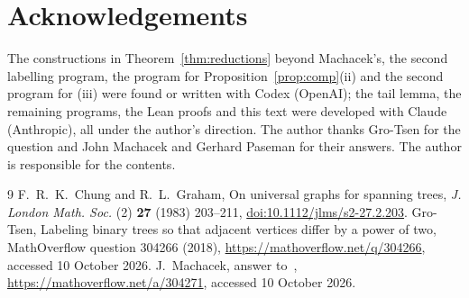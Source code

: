 \documentclass[11pt]{article}
\theoremstyle{remark}
\begin{document}
\section*{Acknowledgements}
The constructions in Theorem~\ref{thm:reductions} beyond Machacek's, the second labelling
program, the program for Proposition~\ref{prop:comp}(ii) and the second program for (iii) were
found or written with Codex (OpenAI); the tail lemma, the remaining programs, the Lean proofs and
this text were developed with Claude (Anthropic), all under the author's direction. The author
thanks Gro-Tsen for the question and John Machacek and Gerhard Paseman for their answers. The
author is responsible for the contents.

\begin{thebibliography}{9}
 F.~R.~K.~Chung and R.~L.~Graham, On universal graphs for spanning trees,
\emph{J. London Math. Soc.} (2) \textbf{27} (1983) 203--211,
\href{https://doi.org/10.1112/jlms/s2-27.2.203}{doi:10.1112/jlms/s2-27.2.203}.
 Gro-Tsen, Labeling binary trees so that adjacent vertices differ by a power of two,
MathOverflow question 304266 (2018), \url{https://mathoverflow.net/q/304266}, accessed 10 October
2026.
 J.~Machacek, answer to~\cite{MO}, \url{https://mathoverflow.net/a/304271}, accessed
10 October 2026.
\end{thebibliography}
\end{document}
